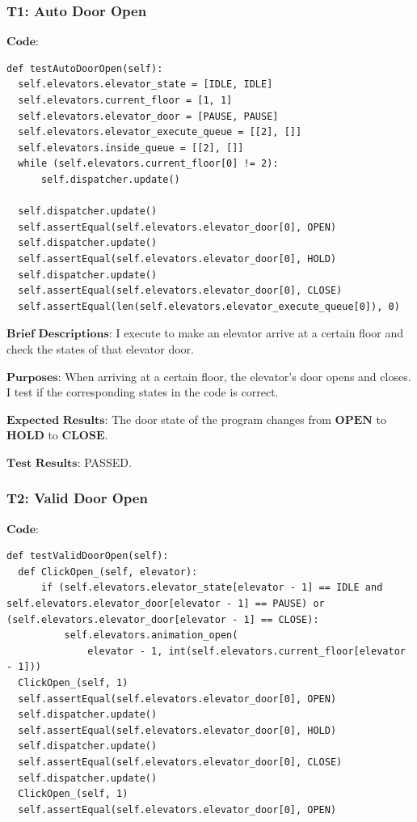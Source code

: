 \documentclass{article}
\begin{document}
\subsubsection*{T1: Auto Door Open}
$\textbf{Code:}$
\begin{lstlisting}
def testAutoDoorOpen(self):
  self.elevators.elevator_state = [IDLE, IDLE]
  self.elevators.current_floor = [1, 1]
  self.elevators.elevator_door = [PAUSE, PAUSE]
  self.elevators.elevator_execute_queue = [[2], []]
  self.elevators.inside_queue = [[2], []]
  while (self.elevators.current_floor[0] != 2):
      self.dispatcher.update()

  self.dispatcher.update()
  self.assertEqual(self.elevators.elevator_door[0], OPEN)
  self.dispatcher.update()
  self.assertEqual(self.elevators.elevator_door[0], HOLD)
  self.dispatcher.update()
  self.assertEqual(self.elevators.elevator_door[0], CLOSE)
  self.assertEqual(len(self.elevators.elevator_execute_queue[0]), 0)
\end{lstlisting}

$\textbf{Brief Descriptions:}$
I execute to make an elevator arrive at a certain floor and check the states of that elevator door.

$\textbf{Purposes:}$
When arriving at a certain floor, the elevator's door opens and closes. I test if the corresponding states in the code is correct.

$\textbf{Expected Results:}$
The door state of the program changes from $\textbf{OPEN}$ to $\textbf{HOLD}$ to $\textbf{CLOSE}$.

$\textbf{Test Results:}$
PASSED.

\subsubsection*{T2: Valid Door Open}
$\textbf{Code:}$
\begin{lstlisting}
def testValidDoorOpen(self):
  def ClickOpen_(self, elevator):
      if (self.elevators.elevator_state[elevator - 1] == IDLE and self.elevators.elevator_door[elevator - 1] == PAUSE) or (self.elevators.elevator_door[elevator - 1] == CLOSE):
          self.elevators.animation_open(
              elevator - 1, int(self.elevators.current_floor[elevator - 1]))
  ClickOpen_(self, 1)
  self.assertEqual(self.elevators.elevator_door[0], OPEN)
  self.dispatcher.update()
  self.assertEqual(self.elevators.elevator_door[0], HOLD)
  self.dispatcher.update()
  self.assertEqual(self.elevators.elevator_door[0], CLOSE)
  self.dispatcher.update()
  ClickOpen_(self, 1)
  self.assertEqual(self.elevators.elevator_door[0], OPEN)
\end{lstlisting}
\end{document}
